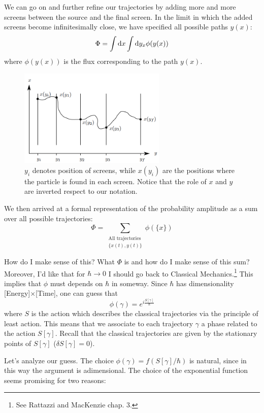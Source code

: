 \documentclass[../main/main.tex]{subfiles}
\begin{document}
We can go on and further refine our trajectories by adding more and more screens between the source and the final screen. In the limit in which the added screens become infinitesimally close, we have specified all possible paths $y(x)$:
\[\Phi=\int\textup{d} x\int \textup{d} y_x\phi(y(x))\]
where $\phi(y(x))$ is the flux corresponding to the path $y(x)$. 

\begin{figure}[H]
\centering
\includegraphics[width=7cm]{../img/Path-int-slit.png}
\caption{$y_i$ denotes position of screens, while $x(y_i)$ are the positions where the particle is found in each screen. Notice that the role of $x$ and $y$ are inverted respect to our notation.}
\end{figure}

We then arrived at a formal representation of the probability amplitude as a sum over all possible trajectories:
\begin{equation}\label{eqn:sketch-total-phase-trajectory}
\Phi=\sum_{\substack{\text{All trajectories}\\\{x(t),y(t)\}}}\phi(\{x\})
\end{equation}

How do I make sense of this? What $\Phi$ is and how do I make sense of this sum?
Moreover, I'd like that for $\hbar\to0$ I should go back to Classical Mechanics.\footnote{See Rattazzi and MacKenzie chap. 3.} This implies that $\phi$ must depends on $\hbar$ in someway.
Since $\hbar$ has dimensionality [Energy]$\times$[Time], one can guess that 
\begin{equation}\label{eqn:path-exp-formula}
\phi(\gamma)=e^{i\frac{S[\gamma]}{\hbar}}
\end{equation}
where $S$ is the action which describes the classical trajectories via the principle of least action. This means that we associate to each trajectory $\gamma$ a phase related to the action $S[\gamma]$. Recall that the classical trajectories are given by the stationary points of $S[\gamma]$ ($\delta S[\gamma]=0$).
 
Let's analyze our guess. The choice $\phi(\gamma)=f(S[\gamma]/\hbar)$ is natural, since in this way the argument is adimensional. The choice of the exponential function seems promising for two reasons:
\end{document}
